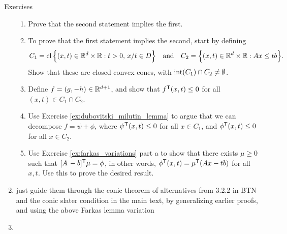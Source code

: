 \begin{xcb}{Exercises}
\begin{enumerate}[label=\thechapter.\arabic*]
\begin{enumerate}[label=\alph*.]
\item Prove that the second statement implies the first.

\item To prove that the first statement implies the second, start by defining 
  \[
  C_1 = \operatorname{cl} \Big\{ (x,t) \in \mathbb{R}^d \times \mathbb{R}: t > 0, \, x/t \in D \Big\}
  \quad \text{and} \quad C_2 = \Big\{ (x,t) \in \mathbb{R}^d \times \mathbb{R}: Ax \leq tb
  \Big\}.  
  \]
  Show that these are closed convex cones, with $\operatorname{int}(C_1) \cap C_2 \not= 
  \emptyset$. 

\item Define $f = (g,-h) \in \mathbb{R}^{d+1}$, and show that $f^{\mathsf{T}} (x,t) \leq 0$ for
  all $(x,t) \in C_1 \cap C_2$.  

\item Use Exercise \ref{ex:dubovitski_milutin_lemma} to argue that we can
  decompose $f = \psi + \phi$, where $\psi^{\mathsf{T}}(x,t) \leq 0$ for all $x \in C_1$,
  and $\phi^{\mathsf{T}} (x,t) \leq 0$ for all $x \in C_2$.

\item Use Exercise \ref{ex:farkas_variations} part a to show that there exists
  $\mu \geq 0$ such that $[A \, -b]^{\mathsf{T}} \mu = \phi$, in other words, $\phi^{\mathsf{T}}
  (x,t) = \mu^{\mathsf{T}} (Ax - tb)$ for all $x,t$. Use this to prove the desired result.       
\end{enumerate}

\item \label{ex:convex_theorem_alternatives_conic}
  just guide them through the conic theorem of alternatives from 3.2.2 in BTN
  and the conic slater condition in the main text, by generalizing earlier
  proofs, and using the above Farkas lemma variation

\item \label{ex:trace_norm_semidefinite} 
 





\end{enumerate}
\end{xcb}
